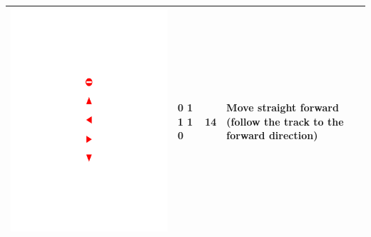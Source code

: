 \documentclass{svproc}
\begin{document}
\begin{table}[!h]
\begin{tabular}{|C{3cm}|C{1.5cm}|C{3cm}|C{4cm}|}
		\begin{minipage}{.075\textwidth}\includegraphics[scale=.5,trim=9.1cm 16cm 9.5cm 10.5cm,clip]{signs.pdf}\end{minipage}	& 0 1 1 1 0	& 14 & Move straight forward (follow the track to the forward direction) \\ \hline

\end{tabular}
\end{table}
\end{document}
